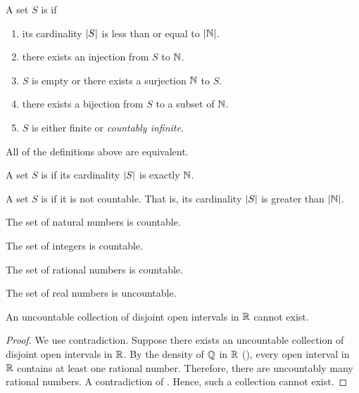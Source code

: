\documentclass[11pt,twoside=off,numbers=noenddot]{scrbook}
\begin{document}
\begin{definition}
  A set $S$ is  if
  \begin{enumerate}
    \item its cardinality $| S |$ is less than or equal to $| \mathbb N |$.
    \item there exists an injection from $S$ to $\NN$.
    \item $S$ is empty or there exists a surjection $\NN$ to $S$.
    \item there exists a bijection from $S$ to a subset of $\NN$.
    \item $S$ is either finite or \textit{countably infinite}.
  \end{enumerate}
  All of the definitions above are equivalent.

  A set $S$ is  if its cardinality
  $| S |$ is exactly $\NN$.

  A set $S$ is  if it is not countable. That is,
  its cardinality $| S |$ is greater than $| \mathbb N |$.
\end{definition}

\begin{corollary}[$\NN$ is countable]
  The set of natural numbers is countable.
\end{corollary}

\begin{corollary}[$\ZZ$ is countable]
  The set of integers is countable.
\end{corollary}

\begin{corollary}[$\QQ$ is countable]
  The set of rational numbers is countable.
\end{corollary}

\begin{corollary}[$\RR$ is uncountable]
  The set of real numbers is uncountable.
\end{corollary}

\begin{theorem}
  An uncountable collection of disjoint open intervals in $\RR$ cannot exist.
\end{theorem}

\begin{proof}
  We use contradiction. Suppose there exists an uncountable
  collection of disjoint open intervals in $\RR$. By the density of
  $\QQ$ in $\RR$ (), every open interval in
  $\RR$ contains at least one rational number. Therefore, there are
  uncountably many rational numbers. A contradiction of
  . Hence, such a collection cannot exist.
\end{proof}
\end{document}
